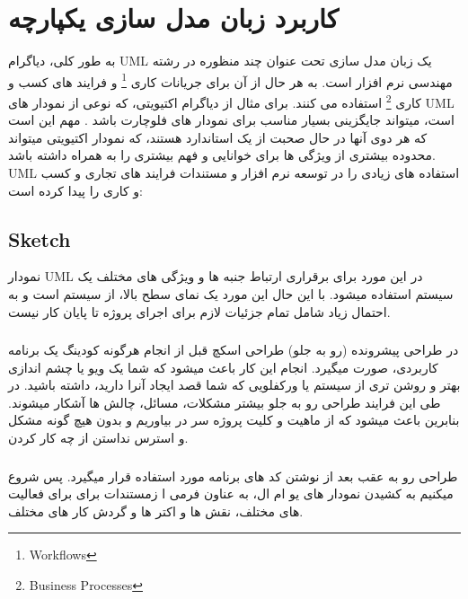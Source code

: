 \documentclass[22pt, a4]{article}
\title{\lr{UML Diagrams}}
\author{%
  علیرضا سلطانی نشان\\
  دانشکده شمسی پور\\
  مهندسی نرم افزار\\
  \texttt{asn80.asn@hotmail.com}
}
\begin{document}
\maketitle
\tableofcontents

\newpage

\section{کاربرد زبان مدل سازی یکپارچه}
به طور کلی، دیاگرام
UML
یک زبان مدل سازی تحت عنوان چند منظوره در رشته مهندسی نرم افزار است.
به هر حال از آن برای جریانات کاری
\footnote{Workflows}
و فرایند های کسب و کاری 
\footnote{Business Processes}
استفاده  می کنند. برای مثال از دیاگرام اکتیویتی، که نوعی از نمودار های 
UML
است، میتواند جایگزینی بسیار مناسب برای نمودار های فلوچارت باشد .
مهم این است که هر دوی آنها در حال صحبت از یک استاندارد هستند، که
نمودار اکتیویتی میتواند محدوده بیشتری از ویژگی ها برای خوانایی و فهم بیشتری را به همراه داشته باشد.\\


UML
استفاده های زیادی را در توسعه نرم افزار و مستندات فرایند های تجاری و کسب و کاری را پیدا کرده است:

\subsection{Sketch}
نمودار UML
در این مورد برای برقراری ارتباط جنبه ها و ویژگی های مختلف یک سیستم استفاده میشود.
با این حال این مورد یک نمای سطح بالا، از سیستم است و به احتمال زیاد شامل تمام جزئیات لازم برای اجرای پروژه تا پایان کار نیست.


\subsubsection{}
در طراحی پیشرونده (رو به جلو)
طراحی اسکچ قبل از انجام هرگونه کودینگ یک برنامه کاربردی، صورت میگیرد. 
انجام این کار باعث میشود که شما یک ویو یا چشم اندازی بهتر و روشن تری از سیستم یا ورکفلویی که شما قصد ایجاد آنرا دارید، داشته باشید.
در طی این فرایند طراحی رو به جلو بیشتر مشکلات، مسائل، چالش ها آشکار میشوند.
بنابرین باعث میشود که از ماهیت و کلیت پروژه سر در بیاوریم و بدون هیچ گونه مشکل و استرس نداستن از چه کار کردن.

\subsubsection{}
طراحی رو به عقب بعد از نوشتن کد های برنامه مورد استفاده قرار میگیرد.
پس شروع میکنیم به کشیدن نمودار های یو ام ال،  به عناون فرمی ا زمستندات برای برای فعالیت های مختلف، نقش ها و اکتر ها و گردش کار های مختلف.
\end{document}
